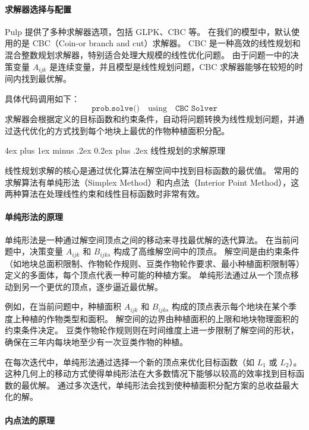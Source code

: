 \documentclass[12pt,a4paper]{nmmcm}
\makeatletter
\renewcommand\subsubsection{\@startsection{subsubsection}{3}{1em}%
  {4ex plus 1ex minus .2ex}%
  {0.2ex plus .2ex}%
  {\normalfont\large\bfseries}}
\makeatother
\begin{document}
\paragraph{求解器选择与配置}

Pulp 提供了多种求解器选项，包括 GLPK、CBC 等。
在我们的模型中，默认使用的是 CBC（Coin-or branch and cut）求解器。
CBC 是一种高效的线性规划和混合整数规划求解器，特别适合处理大规模的线性优化问题。
由于问题一中的决策变量 $A_{ijk}$ 是连续变量，并且模型是线性规划问题，CBC 求解器能够在较短的时间内找到最优解。


具体代码调用如下：
\[
  \texttt{prob.solve()} \quad \text{using} \quad \texttt{CBC Solver}
\]
求解器会根据定义的目标函数和约束条件，自动将问题转换为线性规划问题，并通过迭代优化的方式找到每个地块上最优的作物种植面积分配。


\subsubsection{线性规划的求解原理}

线性规划求解的核心是通过优化算法在解空间中找到目标函数的最优值。
常用的求解算法有单纯形法（Simplex Method）和内点法（Interior Point Method），这两种算法在处理线性约束和线性目标函数时非常有效。


\paragraph{单纯形法的原理}

单纯形法是一种通过解空间顶点之间的移动来寻找最优解的迭代算法。
在当前问题中，决策变量 $A_{ijk}$ 和 $B_{ijks}$ 构成了高维解空间中的顶点。
解空间是由约束条件（如地块总面积限制、作物轮作规则、豆类作物轮作要求、最小种植面积限制等）定义的多面体，每个顶点代表一种可能的种植方案。
单纯形法通过从一个顶点移动到另一个更优的顶点，逐步逼近最优解。


例如，在当前问题中，种植面积 $A_{ijk}$ 和 $B_{ijks}$ 构成的顶点表示每个地块在某个季度上种植的作物类型和面积。
解空间的边界由种植面积的上限和地块物理面积的约束条件决定。
豆类作物轮作规则则在时间维度上进一步限制了解空间的形状，确保在三年内每块地至少有一次豆类作物的种植。


在每次迭代中，单纯形法通过选择一个新的顶点来优化目标函数（如 $L_1$ 或 $L_2$）。
这种几何上的移动方式使得单纯形法在大多数情况下能够以较高的效率找到目标函数的最优解。
通过多次迭代，单纯形法会找到使种植面积分配方案的总收益最大化的解。


\paragraph{内点法的原理}
\end{document}
